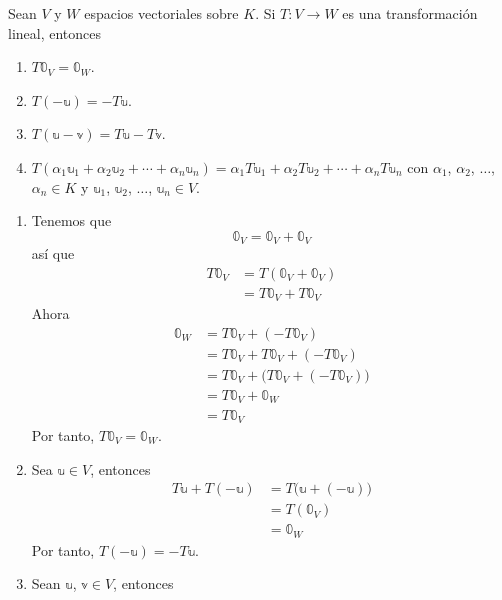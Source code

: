\begin{theorem}
    Sean $V$ y $W$ espacios vectoriales sobre $K$. Si $T: V \longrightarrow W$ es una transformación lineal, entonces
    \begin{enumerate}[label=\roman*)]
        \item $T\mathbb{0}_V = \mathbb{0}_W$.
        \item $T(-\mathbb{u}) = -T\mathbb{u}$.
        \item $T(\mathbb{u} - \mathbb{v}) = T\mathbb{u} - T\mathbb{v}$.
        \item $T(\alpha_1 \mathbb{u}_1 + \alpha_2 \mathbb{u}_2 + \cdots + \alpha_n \mathbb{u}_n) = \alpha_1 T\mathbb{u}_1 + \alpha_2 T\mathbb{u}_2 + \cdots + \alpha_n T\mathbb{u}_n$ con $\alpha_1$, $\alpha_2$, $\dots$, $\alpha_n \in K$ y $\mathbb{u}_1$, $\mathbb{u}_2$, $\dots$, $\mathbb{u}_n \in V$.
    \end{enumerate}
    \demostracion
    \begin{enumerate}[label=\roman*)]
        \item Tenemos que
        $$\mathbb{0}_V = \mathbb{0}_V + \mathbb{0}_V$$
        así que
        \begin{align*}
            T\mathbb{0}_V & = T(\mathbb{0}_V + \mathbb{0}_V) \\
            & = T\mathbb{0}_V + T\mathbb{0}_V
        \end{align*}
        Ahora
        \begin{align*}
            \mathbb{0}_W & = T\mathbb{0}_V + (-T\mathbb{0}_V) \\
            & = T\mathbb{0}_V + T\mathbb{0}_V + (-T\mathbb{0}_V) \\
            & = T\mathbb{0}_V + \big( T\mathbb{0}_V + (-T\mathbb{0}_V) \big) \\
            & = T\mathbb{0}_V + \mathbb{0}_W \\
            & = T\mathbb{0}_V
        \end{align*}
        Por tanto, $T\mathbb{0}_V = \mathbb{0}_W$.
        \item Sea $\mathbb{u} \in V$, entonces
        \begin{align*}
            T\mathbb{u} + T(-\mathbb{u}) & = T\big( \mathbb{u} + (-\mathbb{u}) \big) \\
            & = T(\mathbb{0}_V) \\
            & = \mathbb{0}_W
        \end{align*}
        Por tanto, $T(-\mathbb{u}) = -T\mathbb{u}$.
        \item Sean $\mathbb{u}$, $\mathbb{v} \in V$, entonces

\end{enumerate}
\end{theorem}

